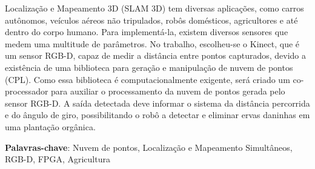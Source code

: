 
\setlength{\absparsep}{18pt} %
\begin{resumo}
	Localização e Mapeamento 3D (SLAM 3D) tem diversas aplicações, como carros autônomos, veículos aéreos não tripulados, robôs domésticos, agricultores e até dentro do corpo humano. Para implementá-la, existem diversos sensores que medem uma multitude de parâmetros. No trabalho, escolheu-se o Kinect, que é um sensor RGB-D, capaz de medir a distância entre pontos capturados, devido a existência de uma biblioteca para geração e manipulação de nuvem de pontos (CPL). Como essa biblioteca é computacionalmente exigente, será criado um co-processador para auxiliar o processamento da nuvem de pontos gerada pelo sensor RGB-D. A saída detectada deve informar o sistema da distância percorrida e do ângulo de giro, possibilitando o robô a detectar e eliminar ervas daninhas em uma plantação orgânica.
	
	\vspace{\onelineskip}
	\noindent 
	\textbf{Palavras-chave}: Nuvem de pontos, Localização e Mapeamento Simultâneos, RGB-D, FPGA, Agricultura
\end{resumo}

\begin{comment}
\begin{resumo}[Abstract]
	\begin{otherlanguage*}{english}
		Resumo em ingles
		
		\vspace{\onelineskip}
		\noindent 
		\textbf{Keywords}: keyword 1.
	\end{otherlanguage*}
\end{resumo}
\end{comment}